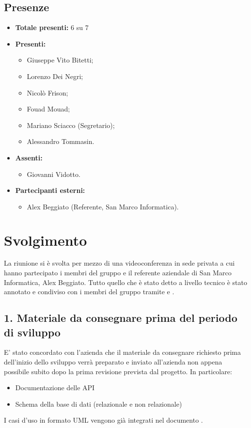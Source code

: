 \subsection*{Presenze}
	\begin{itemize}
		\item \textbf{Totale presenti:} 6 su 7
		\item \textbf{Presenti: }
			\begin{itemize}			
				\item Giuseppe Vito Bitetti;
				\item Lorenzo Dei Negri;
				\item Nicolò Frison;
				\item Fouad Mouad;
				\item Mariano Sciacco (Segretario);
				\item Alessandro Tommasin.
			\end{itemize}
		\item \textbf{Assenti: } 
			\begin{itemize}	
				\item Giovanni Vidotto.
			\end{itemize}
		\item \textbf{Partecipanti esterni:}
			\begin{itemize}
				\item Alex Beggiato (Referente, San Marco Informatica).
			\end{itemize}
	\end{itemize}


\newpage
\section*{Svolgimento}

	La riunione si è svolta per mezzo di una videoconferenza in sede privata a cui hanno partecipato i membri del gruppo e il referente aziendale di San Marco Informatica, Alex Beggiato. Tutto quello che è stato detto a livello tecnico è stato annotato e condiviso con i membri del gruppo tramite  e .

	\subsection*{1. Materiale da consegnare prima del periodo di sviluppo}

	E' stato concordato con l'azienda che il materiale da consegnare richiesto prima dell'inizio dello sviluppo verrà preparato e inviato all'azienda non appena possibile subito dopo la prima revisione prevista dal progetto. In particolare:
	\begin{itemize}
		\item Documentazione delle API
		\item Schema della base di dati (relazionale e non relazionale)
	\end{itemize}
	I casi d'uso in formato UML vengono già integrati nel documento .

